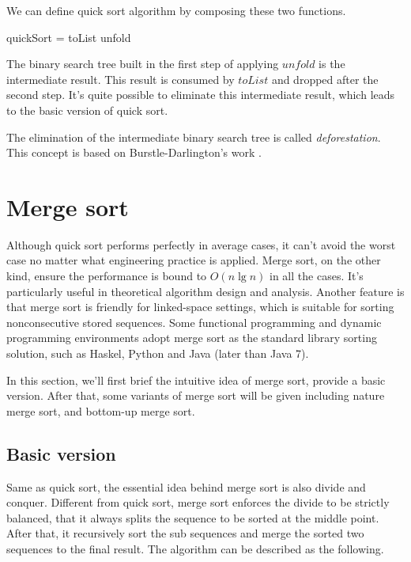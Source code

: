 \documentclass[b5paper]{article}
\begin{document}
We can define quick sort algorithm by composing these two functions.

\be
quickSort = toList \cdot unfold
\ee

The binary search tree built in the first step of applying $unfold$ is the intermediate
result. This
result is consumed by $toList$ and dropped after the second step. It's quite possible to
eliminate this intermediate result, which leads to the basic version of quick sort.

The elimination of the intermediate binary search tree is called {\em deforestation}.
This concept is based on Burstle-Darlington's work \cite{slpj}.


\section{Merge sort}
Although quick sort performs perfectly in average cases, it can't avoid the worst case no matter what
engineering practice is applied. Merge sort, on the other kind, ensure the performance is bound to
$O(n \lg n)$ in all the cases. It's particularly useful in theoretical algorithm design and analysis.
Another feature is that merge sort is friendly for linked-space settings, which is suitable for
sorting nonconsecutive stored sequences. Some functional programming and dynamic programming environments
adopt merge sort as the standard library sorting solution, such as Haskel, Python and Java (later than
Java 7).

In this section, we'll first brief the intuitive idea of merge sort, provide a basic version.
After that, some variants of merge sort will be given including nature merge sort, and bottom-up
merge sort.

\subsection{Basic version}
Same as quick sort, the essential idea behind merge sort is also divide and conquer. Different
from quick sort, merge sort enforces the divide to be strictly balanced, that it always splits the
sequence to be sorted at the middle point. After that, it recursively sort the sub sequences
and merge the sorted two sequences to the final result. The algorithm can be described as the
following.
\end{document}
